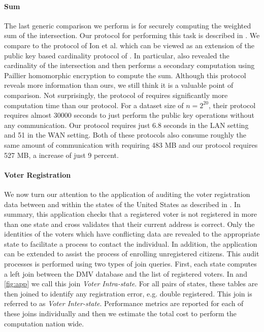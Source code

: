 \paragraph{Sum} The last generic comparison we perform is for securely computing the weighted sum of the intersection. Our protocol for performing this task is described in . We compare to the protocol of Ion et al. \cite{cryptoeprint:2017:738} which can be viewed as an extension of the public key based cardinality protocol of \cite{DBLP:conf/cans/CristofaroGT12}. In particular, \cite{cryptoeprint:2017:738}  also revealed the cardinality of the intersection and then performs a secondary computation using Paillier homomorphic encryption to compute the sum. Although this protocol reveals more information than ours, we still think it is a valuable point of comparison. Not surprisingly,  the protocol of \cite{cryptoeprint:2017:738} requires significantly more computation time than our protocol. For a dataset size of $n=2^{20}$, their protocol requires almost 30000 seconds to just perform the public key operations without any communication. Our protocol requires just 6.8 seconds in the LAN setting and 51 in the WAN setting. Both of these protocols also consume roughly the same amount of communication with \cite{cryptoeprint:2017:738} requiring 483 MB and our protocol requires 527 MB, a increase of just 9 percent. 


\paragraph{Voter Registration} We now turn our attention to the application of auditing the voter registration data between and within the states of the United States as described in . In summary, this application checks that a registered voter is not registered in more than one state and cross validates that their current address is correct. Only the identities of the voters which have conflicting data are revealed to the appropriate state to facilitate a process to contact the individual. In addition, the application can be extended to assist the process of enrolling unregistered citizens. This audit processes is performed using two types of join queries. First, each state computes a left join between the DMV database and the list of registered voters. In  and \ref{fig:app} we call this join \emph{Voter Intra-state}. For all pairs of states, these tables are then joined to identify any registration error, e.g. double registered. This join is referred to as \emph{Voter Inter-state}. Performance metrics are reported for each of these joins individually and then we estimate the total cost to perform the computation nation wide. 


